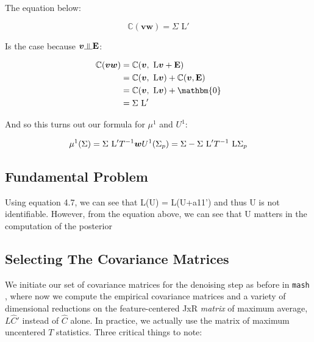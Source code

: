 \documentclass[11pt, oneside]{article}   	%
\newcommand{\indep}{\rotatebox[origin=c]{90}{$\models$}}
\newcommand{\Cov}{\mathbb{C}} %
\newcommand{\wfit}{\bm{w}}
\newcommand{\vb}{\bm{v}}
\def\lstar{\text{ L}}
\def\mash{{\tt mash }}
\begin{document}
{The equation below: 

\begin{equation}
 \Cov(\vb \wfit ) = \Sigma \lstar'
 \end{equation}
 
 Is the case because  $\vb \indep \mathbf{E}$:

\begin{center}
\begin{equation}
\begin{aligned}
\Cov(\vb \wfit ) &=  \Cov(\vb , \lstar \vb  + \mathbf{E}) \\
&= \Cov(\vb , \lstar \vb ) +\Cov(\vb , \mathbf{E}) \\
&= \Cov(\vb , \lstar \vb ) + \mathbm{0} \\
&= \Sigma \lstar' \\
\end{aligned} 
\end{equation}
\end{center}


And so this turns out our formula for $\mu^{1}$ and $U^{1}$:

\begin{center}
\begin{equation}
\mu^{1} ( \Sigma ) = \Sigma \lstar ' T^{-1} \wfit  \\
U^{1} ( \Sigma_p ) = \Sigma - \Sigma \lstar ' T^{-1} \lstar  \Sigma_{p}\\
\end{equation}
\end{center}

\subsection{Fundamental Problem}

Using equation 4.7, we can see that L(U) = L(U+a11') and thus U is not identifiable. However, from the equation above, we can see that U matters in the computation of the posterior

\subsection{Selecting The Covariance Matrices}

We initiate our set of covariance matrices for the denoising step as before in \mash{}, where now we compute the empirical covariance matrices and a variety of dimensional reductions on the feature-centered JxR \textit{matrix} of maximum average, $L \hat{C}' $ instead of $\hat{C}$ alone. In practice, we actually use the matrix of maximum uncentered $T$ statistics. Three critical things to note:

}
\end{document}

